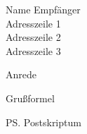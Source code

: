 \documentclass[
    version=last, %
    fontsize=11pt, %
    paper=a4, %
    DIN5008A, %
    ngerman,english, %
]{scrlttr2}
\begin{document}
\begin{letter}{
    Name Empfänger\\
    Adresszeile 1\\
    Adresszeile 2\\
    Adresszeile 3
}
\opening{Anrede}

\Blindtext[6][1]

\closing{Grußformel}

\ps Postskriptum



\end{letter}

\end{document}

